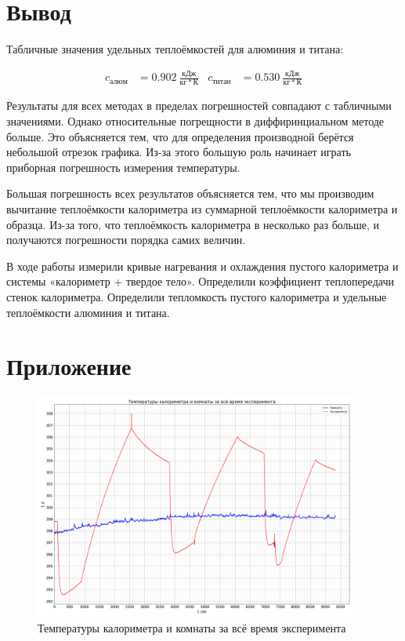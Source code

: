 \documentclass[a4paper, 12pt]{article}
\begin{document}
    \section{Вывод}

        Табличные значения удельных теплоёмкостей для алюминия и титана:

        \begin{align*}
            c_{алюм} &= 0.902~\frac{кДж}{кг*К} & c_{титан} &= 0.530~\frac{кДж}{кг*К}
        \end{align*}

        Результаты для всех методах в пределах погрешностей совпадают с табличными значениями. Однако относительные погрещности в диффиринциальном методе больше. Это объясняется тем, что для определения производной берётся небольшой отрезок графика. Из-за этого большую роль начинает играть приборная погрешность измерения температуры.

        Большая погрешность всех результатов объясняется тем, что мы производим вычитание теплоёмкости калориметра из суммарной теплоёмкости калориметра и образца. Из-за того, что теплоёмкость калориметра в несколько раз больше, и получаются погрешности порядка самих величин.

        В ходе работы измерили кривые нагревания и охлаждения пустого калориметра и системы «калориметр + твердое тело». Определили коэффициент теплопередачи стенок калориметра. Определили тепломкость пустого калориметра и удельные теплоёмкости алюминия и титана.

    \section{Приложение}

        \begin{figure}[!ht]
            \centering
            \includegraphics[angle=90,width=0.95\textwidth]{"img/graph_all.png"}
            \caption{Температуры калориметра и комнаты за всё время эксперимента}
            \label{plot:all}
        \end{figure}
\end{document}
